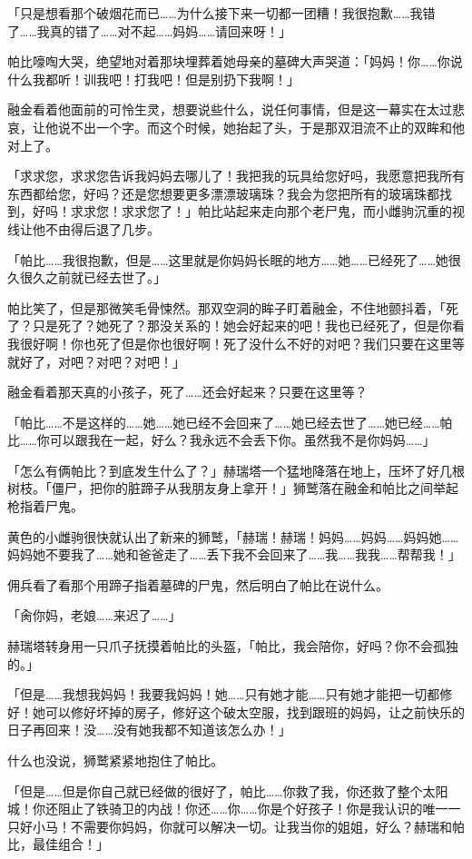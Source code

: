 「只是想看那个破烟花而已……为什么接下来一切都一团糟！我很抱歉……我错了……我真的错了……对不起……妈妈……请回来呀！」

帕比嚎啕大哭，绝望地对着那块埋葬着她母亲的墓碑大声哭道：「妈妈！你……你说什么我都听！训我吧！打我吧！但是别扔下我啊！」

融金看着他面前的可怜生灵，想要说些什么，说任何事情，但是这一幕实在太过悲哀，让他说不出一个字。而这个时候，她抬起了头，于是那双泪流不止的双眸和他对上了。

「求求您，求求您告诉我妈妈去哪儿了！我把我的玩具给您好吗，我愿意把我所有东西都给您，好吗？还是您想要更多漂漂玻璃珠？我会为您把所有的玻璃珠都找到，好吗！求求您！求求您了！」帕比站起来走向那个老尸鬼，而小雌驹沉重的视线让他不由得后退了几步。

「帕比……我很抱歉，但是……这里就是你妈妈长眠的地方……她……已经死了……她很久很久之前就已经去世了。」

帕比笑了，但是那微笑毛骨悚然。那双空洞的眸子盯着融金，不住地颤抖着，「死了？只是死了？她死了？那没关系的！她会好起来的吧！我也已经死了，但是你看我很好啊！你也死了但是你也很好啊！死了没什么不好的对吧？我们只要在这里等就好了，对吧？对吧？对吧！」

融金看着那天真的小孩子，死了……还会好起来？只要在这里等？

「帕比……不是这样的……她……她已经不会回来了……她已经去世了……她已经……帕比……你可以跟我在一起，好么？我永远不会丢下你。虽然我不是你妈妈……」

「怎么有俩帕比？到底发生什么了？」赫瑞塔一个猛地降落在地上，压坏了好几根树枝。「僵尸，把你的脏蹄子从我朋友身上拿开！」狮鹫落在融金和帕比之间举起枪指着尸鬼。

黄色的小雌驹很快就认出了新来的狮鹫，「赫瑞！赫瑞！妈妈……妈妈……妈妈她……妈妈她不要我了……她和爸爸走了……丢下我不会回来了……我……我我……帮帮我！」

佣兵看了看那个用蹄子指着墓碑的尸鬼，然后明白了帕比在说什么。

「肏你妈，老娘……来迟了……」

赫瑞塔转身用一只爪子抚摸着帕比的头盔，「帕比，我会陪你，好吗？你不会孤独的。」

「但是……我想我妈妈！我要我妈妈！她……只有她才能……只有她才能把一切都修好！她可以修好坏掉的房子，修好这个破太空服，找到跟班的妈妈，让之前快乐的日子再回来！没……没有她我都不知道该怎么办！」

什么也没说，狮鹫紧紧地抱住了帕比。

「但是……但是你自己就已经做的很好了，帕比……你救了我，你还救了整个太阳城！你还阻止了铁骑卫的内战！你还……你……你是个好孩子！你是我认识的唯一一只好小马！不需要你妈妈，你就可以解决一切。让我当你的姐姐，好么？赫瑞和帕比，最佳组合！」


